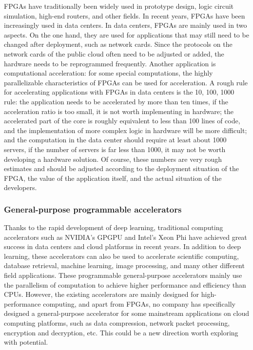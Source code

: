 FPGAs have traditionally been widely used in prototype design, logic circuit simulation, high-end routers, and other fields. In recent years, FPGAs have been increasingly used in data centers. In data centers, FPGAs are mainly used in two aspects. On the one hand, they are used for applications that may still need to be changed after deployment, such as network cards. Since the protocols on the network cards of the public cloud often need to be adjusted or added, the hardware needs to be reprogrammed frequently. Another application is computational acceleration: for some special computations, the highly parallelizable characteristics of FPGAs can be used for acceleration. A rough rule for accelerating applications with FPGAs in data centers is the 10, 100, 1000 rule: the application needs to be accelerated by more than ten times, if the acceleration ratio is too small, it is not worth implementing in hardware; the accelerated part of the core is roughly equivalent to less than 100 lines of code, and the implementation of more complex logic in hardware will be more difficult; and the computation in the data center should require at least about 1000 servers, if the number of servers is far less than 1000, it may not be worth developing a hardware solution. Of course, these numbers are very rough estimates and should be adjusted according to the deployment situation of the FPGA, the value of the application itself, and the actual situation of the developers.

\subsubsection{General-purpose programmable accelerators}

Thanks to the rapid development of deep learning, traditional computing accelerators such as NVIDIA's GPGPU and Intel's Xeon Phi have achieved great success in data centers and cloud platforms in recent years. In addition to deep learning, these accelerators can also be used to accelerate scientific computing, database retrieval, machine learning, image processing, and many other different field applications. These programmable general-purpose accelerators mainly use the parallelism of computation to achieve higher performance and efficiency than CPUs. However, the existing accelerators are mainly designed for high-performance computing, and apart from FPGAs, no company has specifically designed a general-purpose accelerator for some mainstream applications on cloud computing platforms, such as data compression, network packet processing, encryption and decryption, etc. This could be a new direction worth exploring with potential.

